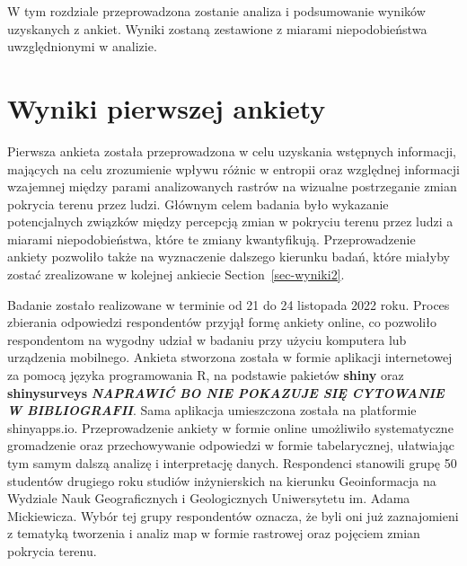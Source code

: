 \documentclass{amuthesis}
\begin{document}
W tym rozdziale przeprowadzona zostanie analiza i podsumowanie wyników
uzyskanych z ankiet. Wyniki zostaną zestawione z miarami niepodobieństwa
uwzględnionymi w analizie.

\hypertarget{sec-wyniki1}{%
\section{Wyniki pierwszej ankiety}\label{sec-wyniki1}}

Pierwsza ankieta została przeprowadzona w celu uzyskania wstępnych
informacji, mających na celu zrozumienie wpływu różnic w entropii oraz
względnej informacji wzajemnej między parami analizowanych rastrów na
wizualne postrzeganie zmian pokrycia terenu przez ludzi. Głównym celem
badania było wykazanie potencjalnych związków między percepcją zmian w
pokryciu terenu przez ludzi a miarami niepodobieństwa, które te zmiany
kwantyfikują. Przeprowadzenie ankiety pozwoliło także na wyznaczenie
dalszego kierunku badań, które miałyby zostać zrealizowane w kolejnej
ankiecie Section~\ref{sec-wyniki2}.

Badanie zostało realizowane w terminie od 21 do 24 listopada 2022 roku.
Proces zbierania odpowiedzi respondentów przyjął formę ankiety online,
co pozwoliło respondentom na wygodny udział w badaniu przy użyciu
komputera lub urządzenia mobilnego. Ankieta stworzona została w formie
aplikacji internetowej za pomocą języka programowania R, na podstawie
pakietów \textbf{shiny} \autocite*{R-shiny} oraz \textbf{shinysurveys}
\autocite*{R-shinysurveys} \textbf{\emph{NAPRAWIĆ BO NIE POKAZUJE SIĘ
CYTOWANIE W BIBLIOGRAFII}}. Sama aplikacja umieszczona została na
platformie shinyapps.io. Przeprowadzenie ankiety w formie online
umożliwiło systematyczne gromadzenie oraz przechowywanie odpowiedzi w
formie tabelarycznej, ułatwiając tym samym dalszą analizę i
interpretację danych. Respondenci stanowili grupę 50 studentów drugiego
roku studiów inżynierskich na kierunku Geoinformacja na Wydziale Nauk
Geograficznych i Geologicznych Uniwersytetu im. Adama Mickiewicza. Wybór
tej grupy respondentów oznacza, że byli oni już zaznajomieni z tematyką
tworzenia i analiz map w formie rastrowej oraz pojęciem zmian pokrycia
terenu.
\end{document}
